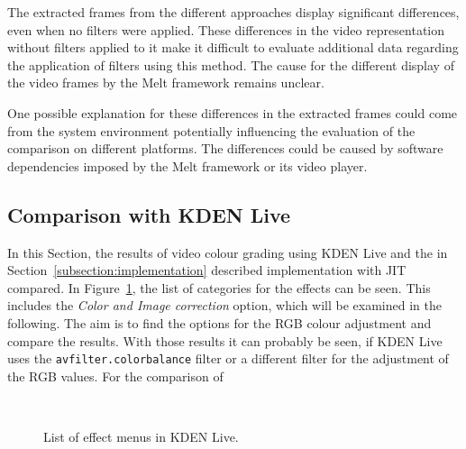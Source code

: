 \documentclass[../MasterThesis.tex]{subfiles}
\begin{document}
\vspace*{1.5em}
The extracted frames from the different approaches display significant differences, even when no filters were applied. 
These differences in the video representation without filters applied to it make it difficult to evaluate additional data regarding the application of filters using this method. The cause for the different display of the video frames by the Melt framework remains unclear.


One possible explanation for these differences in the extracted frames could come from the system environment potentially influencing the evaluation of the comparison on different platforms. The differences could be caused by software dependencies imposed by the Melt framework or its video player.
















\subsection{Comparison with KDEN Live} \label{section:comparisonKDENLive}


\begin{minipage}{0.48\textwidth}
	
	In this Section, the results of video colour grading using KDEN Live and the in Section~\ref{subsection:implementation} described implementation with JIT compared. In Figure~\ref{figure:kdenlive_effects}, the list of categories for the effects can be seen. This includes the \textit{Color and Image correction} option, which will be examined in the following. The aim is to find the options for the RGB colour adjustment and compare the results. With those results it can probably be seen, if KDEN Live uses the \texttt{avfilter.colorbalance} filter or a different filter for the adjustment of the RGB values. For the comparison of
	
	
\end{minipage}\begin{minipage}{0.04\textwidth}
	\ 
\end{minipage}\begin{minipage}{0.48\textwidth}
	\begin{figure}[H]
		\begin{center}
			\caption[List of effect menus in KDEN Live.]{List of effect menus in KDEN Live.}
			\label{figure:kdenlive_effects}
		\end{center}
	\end{figure}
	\hfill
\end{minipage}
\end{document}
